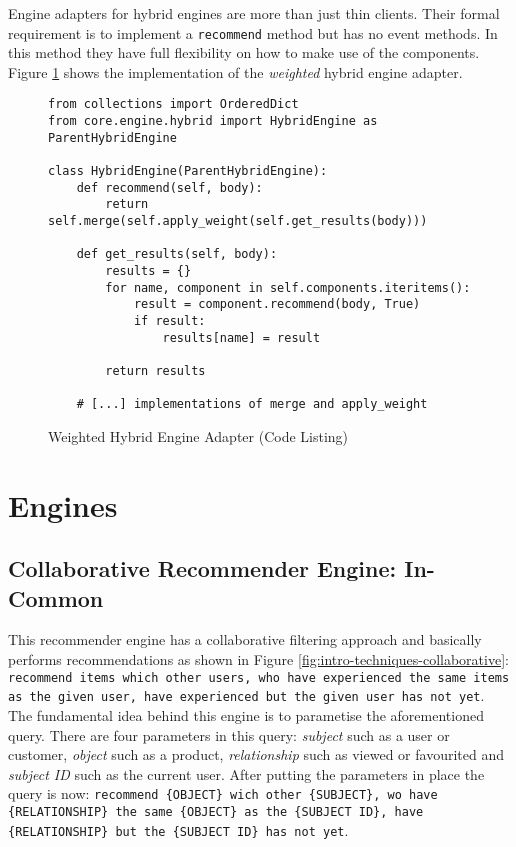 Engine adapters for hybrid engines are more than just thin clients. Their formal requirement is to implement a \texttt{recommend} method but has no event methods. In this method they have full flexibility on how to make use of the components. Figure \ref{fig:implementation-framework-hybrid-engine-adapter} shows the implementation of the \emph{weighted} hybrid engine adapter.

\begin{figure}[!ht]
    \begin{verbatim}
from collections import OrderedDict
from core.engine.hybrid import HybridEngine as ParentHybridEngine

class HybridEngine(ParentHybridEngine):
    def recommend(self, body):
        return self.merge(self.apply_weight(self.get_results(body)))

    def get_results(self, body):
        results = {}
        for name, component in self.components.iteritems():
            result = component.recommend(body, True)
            if result:
                results[name] = result

        return results

    # [...] implementations of merge and apply_weight
    \end{verbatim}
    \caption{Weighted Hybrid Engine Adapter (Code Listing)}
    \label{fig:implementation-framework-hybrid-engine-adapter}
\end{figure}



\section{Engines}

\subsection{Collaborative Recommender Engine: In-Common}

This recommender engine has a collaborative filtering approach and basically performs recommendations as shown in Figure \ref{fig:intro-techniques-collaborative}: \texttt{recommend items which other users, who have experienced the same items as the given user, have experienced but the given user has not yet}. The fundamental idea behind this engine is to parametise the aforementioned query. There are four parameters in this query: \emph{subject} such as a user or customer, \emph{object} such as a product, \emph{relationship} such as viewed or favourited and \emph{subject ID} such as the current user. After putting the parameters in place the query is now: \texttt{recommend \{OBJECT\} wich other \{SUBJECT\}, wo have \{RELATIONSHIP\} the same \{OBJECT\} as the \{SUBJECT ID\}, have \{RELATIONSHIP\} but the \{SUBJECT ID\} has not yet}.

